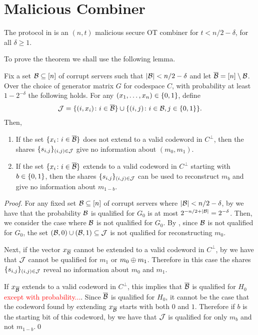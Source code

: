 \section{Malicious Combiner}



\begin{theorem}\label{thm:main}
	The protocol in  is an $(n,t)$ malicious secure OT combiner for $t < n/2 - \delta$, for all $\delta \geq 1$.
\end{theorem}

To prove the theorem we shall use the following lemma.
\begin{lemma}\label{lem:secret-info}
	Fix a set ${\mathcal B} \subseteq [n]$ of corrupt servers such that $|{\mathcal B}| < n/2 - \delta$ and let $\overline{{\mathcal B}} = [n]\setminus {\mathcal B}$.
	Over the choice of generator matrix $G$ for codespace $C$, with probability at least $1-2^{-\delta}$ the following holds.
	For any $(x_1,\dotsc, x_n) \in {\{0,1\}}$, define
	\begin{align*}
		{\mathcal J} = \{ (i,x_i)\colon i \in \overline{{\mathcal B}} \} \cup \{ (i,j) \colon i \in{\mathcal B}, j \in {\{0,1\}} \}.
	\end{align*}
	Then,
	\begin{enumerate}
		\item If the set $\{x_i \colon i \in \overline{{\mathcal B}} \}$ does not extend to a valid codeword in $C^\perp$, then the shares $\{ s_{i,j} \}_{(i,j) \in {\mathcal J}}$ give no information about $(m_0,m_1)$.
		\item If the set $\{x_i\colon i \in \overline{{\mathcal B}}\}$ extends to a valid codeword in $C^\perp$ starting with $b \in {\{0,1\}}$, then the shares $\{s_{i,j}\}_{(i,j)\in {\mathcal J}}$ can be used to reconstruct $m_b$ and give no information about $m_{1-b}$.
	\end{enumerate}
\end{lemma}
\begin{proof}
	For any fixed set ${\mathcal B}\subseteq [n]$ of corrupt servers where $|{\mathcal B}| < n/2 - \delta$, by  we have that the probability ${\mathcal B}$ is qualified for $G_0$ is at most $2^{-n/2 + |{\mathcal B}|} = 2^{-\delta}$.
	Then, we consider the case where ${\mathcal B}$ is not qualified for $G_0$.
	By , since ${\mathcal B}$ is not qualified for $G_0$, the set $({\mathcal B}, 0) \cup ({\mathcal B},1) \subseteq {\mathcal J}$ is not qualified for reconstructing $m_0$.
	
	Next, if the vector $x_{\overline{{\mathcal B}}}$ cannot be extended to a valid codeword in $C^\perp$, by  we have that ${\mathcal J}$ cannot be qualified for $m_1$ or $m_0 \oplus m_1$.
	Therefore in this case the shares $\{ s_{i,j} \}_{(i,j) \in {\mathcal J}}$ reveal no information about $m_0$ and $m_1$.
	
	If $x_{\overline{{\mathcal B}}}$ extends to a valid codeword in $C^\perp$, this implies that $\overline{{\mathcal B}}$ is qualified for $H_0$ \textcolor{red}{except with probability...}.
	Since $\overline{{\mathcal B}}$ is qualified for $H_0$, it cannot be the case that the codeword found by extending $x_{\overline{{\mathcal B}}}$ starts with both $0$ and $1$.
	Therefore if $b$ is the starting bit of this codeword, by  we have that ${\mathcal J}$ is qualified for only $m_b$ and not $m_{1-b}$.\qed
\end{proof}

